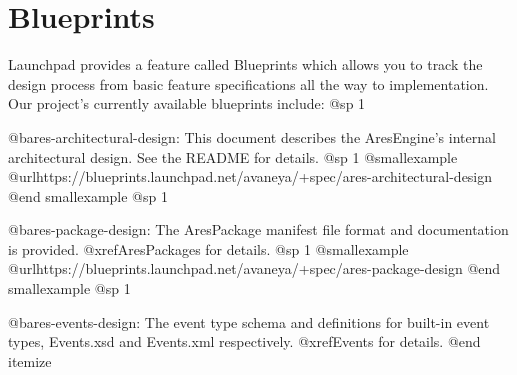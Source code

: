 \section{Blueprints}
Launchpad provides a feature called Blueprints which allows you to track the design process from basic feature specifications all the way to implementation. Our project's currently available blueprints include:
@sp 1

\itemize
\item
@b{ares-architectural-design}: This document describes the AresEngine's internal architectural design. See the README for details.
@sp 1
@smallexample
@url{https://blueprints.launchpad.net/avaneya/+spec/ares-architectural-design}
@end smallexample
@sp 1

\item
@b{ares-package-design}: The AresPackage manifest file format and documentation is provided. @xref{AresPackages} for details.
@sp 1
@smallexample
@url{https://blueprints.launchpad.net/avaneya/+spec/ares-package-design}
@end smallexample
@sp 1

\item
@b{ares-events-design}: The event type schema and definitions for built-in event types, Events.xsd and Events.xml respectively. @xref{Events} for details.
@end itemize

